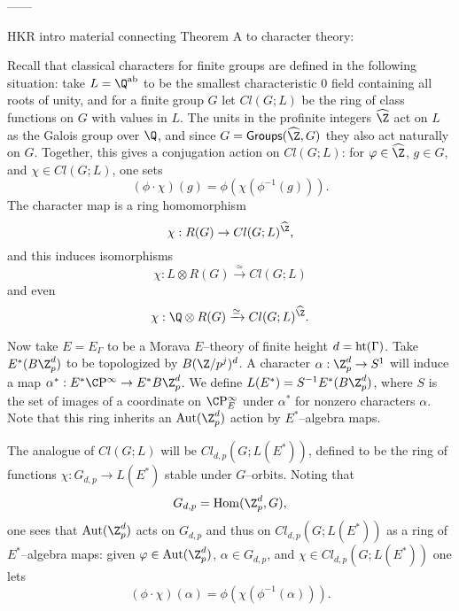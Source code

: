 ------

HKR intro material connecting Theorem A to character theory:

Recall that classical characters for finite groups are defined in the following situation: take $L = \Q^{\mathrm{ab}}$ to be the smallest characteristic $0$ field containing all roots of unity, and for a finite group $G$ let $Cl(G; L)$ be the ring of class functions on $G$ with values in $L$.  The units in the profinite integers $\widehat{\Z}$ act on $L$ as the Galois group over $\Q$, and since $G = \CatOf{Groups}(\widehat{\Z}, G)$ they also act naturally on $G$.  Together, this gives a conjugation action on $Cl(G; L)$: for $\phi \in \widehat{\Z}$, $g \in G$, and $\chi \in Cl(G; L)$, one sets \[(\phi \cdot \chi)(g) = \phi(\chi(\phi^{-1}(g))).\]  The character map is a ring homomorphism \[\chi: R(G) \to Cl(G; L)^{\widehat{\Z}},\] and this induces isomorphisms \[\chi: L \otimes R(G) \xrightarrow{\simeq} Cl(G; L)\] and even \[\chi: \Q \otimes R(G) \xrightarrow{\simeq} Cl(G; L)^{\widehat{\Z}}.\]

Now take $E = E_\Gamma$ to be a Morava $E$--theory of finite height $d = \operatorname{ht}(\Gamma)$.  Take $E^*(B\Z_p^d)$ to be topologized by $B(\Z/p^j)^d$.  A character $\alpha: \Z_p^d \to S^1$ will induce a map $\alpha^*: E^* \CP^\infty \to E^* B\Z_p^d$.  We define $L(E^*) = S^{-1} E^*(B\Z_p^d)$, where $S$ is the set of images of a coordinate on $\CP^\infty_E$ under $\alpha^*$ for nonzero characters $\alpha$.  Note that this ring inherits an $\operatorname{Aut}(\Z_p^d)$ action by $E^*$--algebra maps.

The analogue of $Cl(G; L)$ will be $Cl_{d,p}(G; L(E^*))$, defined to be the ring of functions $\chi: G_{d, p} \to L(E^*)$ stable under $G$--orbits.  Noting that \[G_{d,p} = \operatorname{Hom}(\Z_p^d, G),\] one sees that $\operatorname{Aut}(\Z_p^d)$ acts on $G_{d,p}$ and thus on $Cl_{d,p}(G; L(E^*))$ as a ring of $E^*$--algebra maps: given $\phi \in \operatorname{Aut}(\Z_p^d)$, $\alpha \in G_{d,p}$, and $\chi \in Cl_{d,p}(G; L(E^*))$ one lets \[(\phi \cdot \chi)(\alpha) = \phi(\chi(\phi^{-1}(\alpha))).\]

